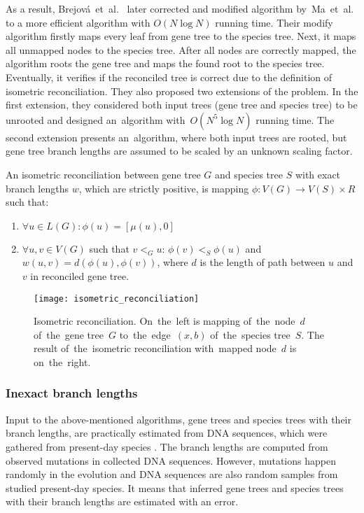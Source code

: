 As a result, Brejová~et~al.~\cite{brejova} later corrected and modified algorithm by~Ma~et~al. to a more efficient algorithm with $O(N \log N)$ running time. Their modify algorithm firstly maps every leaf from gene tree to the species tree. Next, it maps all unmapped nodes to the species tree. After all nodes are correctly mapped, the algorithm roots the gene tree and maps the found root to the species tree. Eventually, it verifies if the reconciled tree is correct due to the definition of isometric reconciliation. They also proposed two extensions of the problem. In the first extension, they considered both input trees (gene tree and species tree) to be unrooted and designed an~algorithm with~$O(N^5 \log N)$ running time. The second extension presents an~algorithm, where both input trees are rooted, but gene tree branch lengths are assumed to be scaled by an unknown scaling factor.

\begin{definition}
An isometric reconciliation between gene tree $G$ and species tree $S$ with exact branch lengths $w$, which are strictly positive, is mapping $\phi: V(G) \rightarrow V(S) \times R$ such that:
	\begin{enumerate}\itemsep0em
	\item $\forall u \in L(G): \phi(u) = [\mu(u), 0]$
	\item $\forall u, v \in V(G)$ such that $v<_Gu$: $\phi(v)<_S\phi(u)$ and $w(u, v) = d(\phi(u), \phi(v))$, where $d$ is the length of path between $u$ and $v$ in reconciled gene tree.
	\end{enumerate}
\end{definition}

\begin{figure}[ht]
	\centering
	\label{isometric_reconciliation}
  	\texttt{[image: isometric\_reconciliation]}
  	\caption{Isometric reconciliation. On~the~left is mapping of~the~node~$d$ of~the~gene tree~$G$ to~the~edge~$(x, b)$ of~the~species tree~$S$. The result of~the~isometric reconciliation with~mapped node~$d$ is on~the~right.}
\end{figure}

\subsubsection{Inexact branch lengths}

Input to the above-mentioned algorithms, gene trees and species trees with their branch lengths, are practically estimated from DNA sequences, which were gathered from present-day species \cite{felsenstein}. The branch lengths are computed from observed mutations in collected DNA sequences. However, mutations happen randomly in the evolution and DNA sequences are also random samples from studied present-day species. It means that inferred gene trees and species trees with their branch lengths are estimated with an error.

